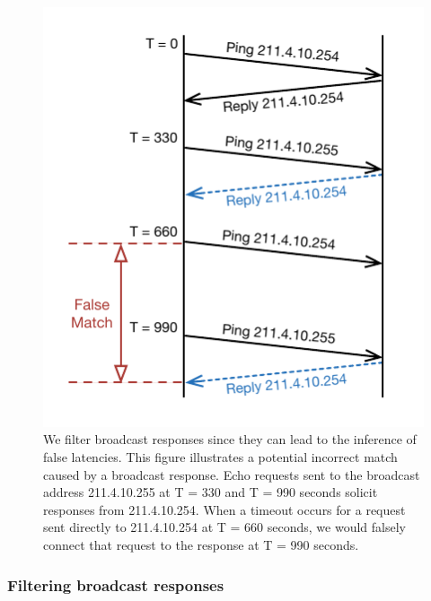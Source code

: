 \begin{figure}[tb]
\begin{center}
\includegraphics[width=0.97\linewidth]{timeouts/figs/wfall_bcast}
\end{center}
\caption{\label{fig:bcast_sample}%
We filter broadcast responses since they can lead to the inference of
false latencies. This figure illustrates a potential incorrect match
caused by a broadcast response.
Echo requests sent to the broadcast address 211.4.10.255 at T = 330
and T = 990 seconds solicit responses from 211.4.10.254.  When a timeout occurs 
for a request sent directly to 211.4.10.254 at T = 660 seconds, we 
would falsely connect that request to the response at T = 990 seconds.}
\end{figure}

%

\subsubsection*{Filtering broadcast responses}


